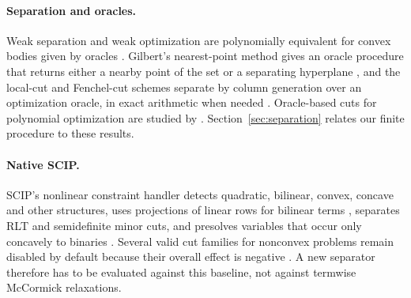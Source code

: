 \paragraph{Separation and oracles.}
Weak separation and weak optimization are polynomially equivalent for
convex bodies given by oracles \citep{GrotschelLovaszSchrijver1981,GrotschelLovaszSchrijver1988}.
Gilbert's nearest-point method gives an oracle procedure that returns
either a nearby point of the set or a separating hyperplane
\citep{Gilbert1966,BrierleyNavascuesVertesi2016}, and the local-cut and
Fenchel-cut schemes separate by column generation over an optimization
oracle, in exact arithmetic when needed \citep{Boyd1994,ChvatalCookEspinoza2013}.
Oracle-based cuts for polynomial optimization are studied by
\citet{BienstockChenMunoz2020}. Section~\ref{sec:separation} relates our
finite procedure to these results.

\paragraph{Native SCIP.}
SCIP's nonlinear constraint handler detects quadratic, bilinear,
convex, concave and other structures, uses projections of linear rows for
bilinear terms \citep{MullerSerranoGleixner2020}, separates RLT and
semidefinite minor cuts, and presolves variables that occur only
concavely to binaries \citep{BestuzhevaEtAl2025,SCIP8report}. Several valid
cut families for nonconvex problems remain disabled by default because
their overall effect is negative \citep{BestuzhevaEtAl2025,SCIP10}. A new
separator therefore has to be evaluated against this baseline, not
against termwise McCormick relaxations.
